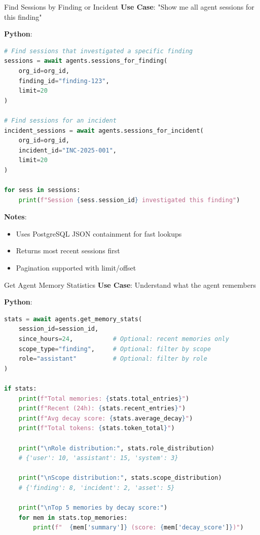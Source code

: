\documentclass[aspectratio=169]{beamer}
\begin{document}
\begin{frame}[fragile]{Find Sessions by Finding or Incident}
\textbf{Use Case}: "Show me all agent sessions for this finding"

\textbf{Python}:
\begin{lstlisting}[language=Python]
# Find sessions that investigated a specific finding
sessions = await agents.sessions_for_finding(
    org_id=org_id,
    finding_id="finding-123",
    limit=20
)

# Find sessions for an incident
incident_sessions = await agents.sessions_for_incident(
    org_id=org_id,
    incident_id="INC-2025-001",
    limit=20
)

for sess in sessions:
    print(f"Session {sess.session_id} investigated this finding")
\end{lstlisting}

\textbf{Notes}:
\begin{itemize}
  \item Uses PostgreSQL JSON containment for fast lookups
  \item Returns most recent sessions first
  \item Pagination supported with limit/offset
\end{itemize}
\end{frame}

\begin{frame}[fragile]{Get Agent Memory Statistics}
\textbf{Use Case}: Understand what the agent remembers

\textbf{Python}:
\begin{lstlisting}[language=Python]
stats = await agents.get_memory_stats(
    session_id=session_id,
    since_hours=24,           # Optional: recent memories only
    scope_type="finding",     # Optional: filter by scope
    role="assistant"          # Optional: filter by role
)

if stats:
    print(f"Total memories: {stats.total_entries}")
    print(f"Recent (24h): {stats.recent_entries}")
    print(f"Avg decay score: {stats.average_decay}")
    print(f"Total tokens: {stats.token_total}")
    
    print("\nRole distribution:", stats.role_distribution)
    # {'user': 10, 'assistant': 15, 'system': 3}
    
    print("\nScope distribution:", stats.scope_distribution)
    # {'finding': 8, 'incident': 2, 'asset': 5}
    
    print("\nTop 5 memories by decay score:")
    for mem in stats.top_memories:
        print(f"  {mem['summary']} (score: {mem['decay_score']})")
\end{lstlisting}
\end{frame}
\end{document}
